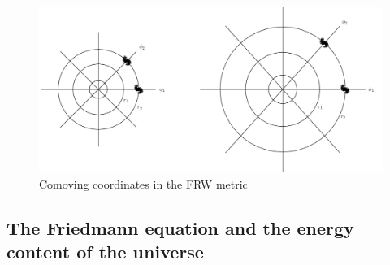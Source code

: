 \documentclass[11pt, a4paper,oneside,openright]{book}
\numberwithin{equation}{section}
\begin{document}
\begin{figure}[ht]
\begin{center}
\includegraphics[scale=0.5]{Draw/lec6_1.png}
\end{center}
\caption{Comoving coordinates in the FRW metric}
\label{fig:lec6_1}
\end{figure}

\subsection{The Friedmann equation and the energy content of the universe}
\end{document}
